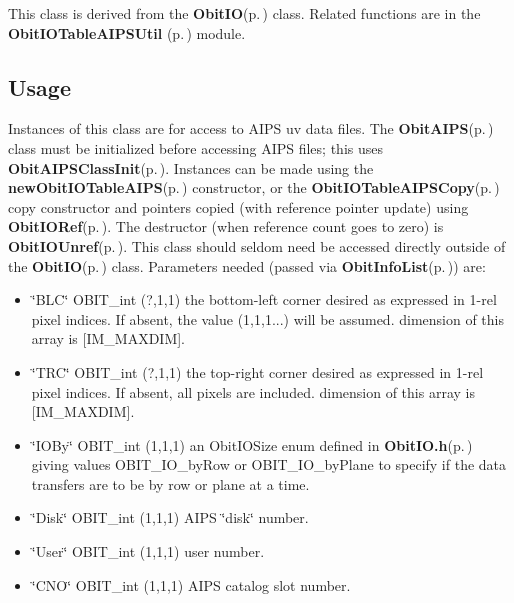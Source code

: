 This class is derived from the {\bf Obit\-IO}{\rm (p.\,\pageref{structObitIO})} class. Related functions are in the {\bf Obit\-IOTable\-AIPSUtil }{\rm (p.\,\pageref{ObitIOTableAIPSUtil_8h})} module.\subsection{Usage}\label{ObitIOTableAIPS_8h_ObitIOTableAIPSUsage}
Instances of this class are for access to AIPS uv data files. The {\bf Obit\-AIPS}{\rm (p.\,\pageref{structObitAIPS})} class must be initialized before accessing AIPS files; this uses {\bf Obit\-AIPSClass\-Init}{\rm (p.\,\pageref{ObitAIPS_8c_a5})}. Instances can be made using the {\bf new\-Obit\-IOTable\-AIPS}{\rm (p.\,\pageref{ObitIOTableAIPS_8c_a9})} constructor, or the {\bf Obit\-IOTable\-AIPSCopy}{\rm (p.\,\pageref{ObitIOTableAIPS_8c_a13})} copy constructor and pointers copied (with reference pointer update) using {\bf Obit\-IORef}{\rm (p.\,\pageref{ObitIO_8h_a1})}. The destructor (when reference count goes to zero) is {\bf Obit\-IOUnref}{\rm (p.\,\pageref{ObitIO_8h_a0})}. This class should seldom need be accessed directly outside of the {\bf Obit\-IO}{\rm (p.\,\pageref{structObitIO})} class. Parameters needed (passed via {\bf Obit\-Info\-List}{\rm (p.\,\pageref{structObitInfoList})}) are: \begin{itemize}
\item \char`\"{}BLC\char`\"{} OBIT\_\-int (?,1,1) the bottom-left corner desired as expressed in 1-rel pixel indices. If absent, the value (1,1,1...) will be assumed. dimension of this array is [IM\_\-MAXDIM]. \item \char`\"{}TRC\char`\"{} OBIT\_\-int (?,1,1) the top-right corner desired as expressed in 1-rel pixel indices. If absent, all pixels are included. dimension of this array is [IM\_\-MAXDIM]. \item \char`\"{}IOBy\char`\"{} OBIT\_\-int (1,1,1) an Obit\-IOSize enum defined in {\bf Obit\-IO.h}{\rm (p.\,\pageref{ObitIO_8h})} giving values OBIT\_\-IO\_\-by\-Row or OBIT\_\-IO\_\-by\-Plane to specify if the data transfers are to be by row or plane at a time. \item \char`\"{}Disk\char`\"{} OBIT\_\-int (1,1,1) AIPS \char`\"{}disk\char`\"{} number. \item \char`\"{}User\char`\"{} OBIT\_\-int (1,1,1) user number. \item \char`\"{}CNO\char`\"{} OBIT\_\-int (1,1,1) AIPS catalog slot number.\end{itemize}



